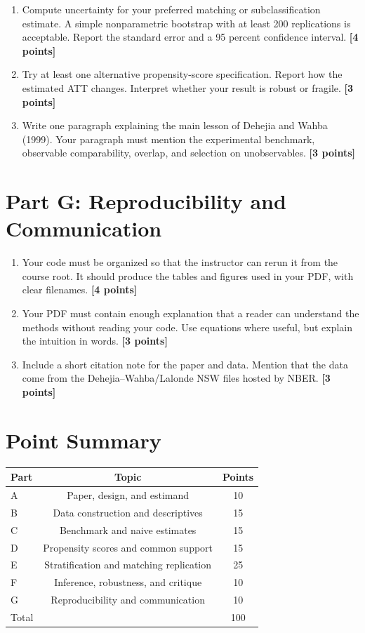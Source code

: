 \documentclass[11pt]{article}
\newcommand{\points}[1]{\hfill \textbf{[#1 points]}}
\begin{document}
\begin{enumerate}[label=F\arabic*.]
  \item Compute uncertainty for your preferred matching or subclassification estimate. A simple nonparametric bootstrap with at least 200 replications is acceptable. Report the standard error and a 95 percent confidence interval. \points{4}

  \item Try at least one alternative propensity-score specification. Report how the estimated ATT changes. Interpret whether your result is robust or fragile. \points{3}

  \item Write one paragraph explaining the main lesson of Dehejia and Wahba (1999). Your paragraph must mention the experimental benchmark, observable comparability, overlap, and selection on unobservables. \points{3}
\end{enumerate}

\section*{Part G: Reproducibility and Communication}

\begin{enumerate}[label=G\arabic*.]
  \item Your code must be organized so that the instructor can rerun it from the course root. It should produce the tables and figures used in your PDF, with clear filenames. \points{4}

  \item Your PDF must contain enough explanation that a reader can understand the methods without reading your code. Use equations where useful, but explain the intuition in words. \points{3}

  \item Include a short citation note for the paper and data. Mention that the data come from the Dehejia--Wahba/Lalonde NSW files hosted by NBER. \points{3}
\end{enumerate}

\section*{Point Summary}
\begin{center}
\begin{tabular}{lcc}
\toprule
Part & Topic & Points \\
\midrule
A & Paper, design, and estimand & 10 \\
B & Data construction and descriptives & 15 \\
C & Benchmark and naive estimates & 15 \\
D & Propensity scores and common support & 15 \\
E & Stratification and matching replication & 25 \\
F & Inference, robustness, and critique & 10 \\
G & Reproducibility and communication & 10 \\
\midrule
Total & & 100 \\
\bottomrule
\end{tabular}
\end{center}
\end{document}
